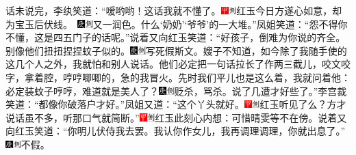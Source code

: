 话未说完，李纨笑道：“嗳哟哟！这话我就不懂了。{\includegraphics[width=3mm]{../Images/00002}\includegraphics[width=3mm]{../Images/00011}\footnotesize \kaishu 红玉今日方遂心如意，却为宝玉后伏线。　\includegraphics[width=3mm]{../Images/00004}\includegraphics[width=3mm]{../Images/00011}\footnotesize \kaishu 又一润色。}什么‘奶奶’‘爷爷’的一大堆。”凤姐笑道：“怨不得你不懂，这是四五门子的话呢。”说着又向红玉笑道：“好孩子，倒难为你说的齐全。别像他们扭扭捏捏蚊子似的。{\includegraphics[width=3mm]{../Images/00004}\includegraphics[width=3mm]{../Images/00011}\footnotesize \kaishu 写死假斯文。}嫂子不知道，如今除了我随手使的这几个人之外，我就怕和别人说话。他们必定把一句话拉长了作两三截儿，咬文咬字，拿着腔，哼哼唧唧的，急的我冒火。先时我们平儿也是这么着，我就问着他：必定装蚊子哼哼，难道就是美人了？{\includegraphics[width=3mm]{../Images/00004}\includegraphics[width=3mm]{../Images/00011}\footnotesize \kaishu 贬杀，骂杀。}说了几遭才好些了。”李宫裁笑道：“都像你破落户才好。”凤姐又道：“这个丫头就好。{\includegraphics[width=3mm]{../Images/00002}\includegraphics[width=3mm]{../Images/00011}\footnotesize \kaishu 红玉听见了么？}方才说话虽不多，听那口气就简断。”{\includegraphics[width=3mm]{../Images/00002}\includegraphics[width=3mm]{../Images/00011}\footnotesize \kaishu 红玉此刻心内想：可惜晴雯等不在傍。}说着又向红玉笑道：“你明儿伏侍我去罢。我认你作女儿，我再调理调理，你就出息了。”{\includegraphics[width=3mm]{../Images/00004}\includegraphics[width=3mm]{../Images/00011}\footnotesize \kaishu 不假。}

